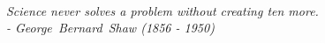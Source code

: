 

{
\thispagestyle{empty}
~\vfill

\begin{doublespace}
\noindent\fontsize{16}{22}\selectfont\itshape
\nohyphenation
Science never solves a problem without creating ten more.\\
\noindent - \mbox{George Bernard Shaw} (1856 - 1950)
\end{doublespace}

\vfill
\vfill
}
